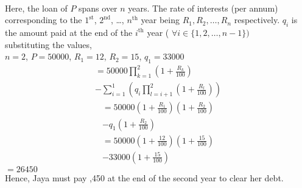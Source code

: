 \documentclass[journal,12pt,two column]{IEEEtran}
\begin{document}
\begin{enumerate}
\begin{multline}
\end{multline}
%
Here,
 the loan of \rupee$P$ spans over $n$ years. The rate of interests (per annum) corresponding to the $1^\text{st}$, $2^\text{nd}$, \ldots, $n^\text{th}$ year being $R_1, R_2, \ldots, R_n$  respectively. \rupee$q_i$ is the amount paid at the end of the  $i^\text{th}$ year ( $\forall i\in \{1,2,\ldots,n-1\})$\\
substituting the values,\\
$n = 2$, $P = 50000$, $R_1=12$, $R_2=15$, ${q_1=33000}$
 \begin{multline*}
     = 50000 \prod_{k = 1}^{2}  {\left(  1+\frac{R_k}{100}     \right)} \\ - \sum_{i=1}^{1}{\left(q_i\prod_{l=i+1}^{2}{\left(1+\frac{R_l}{100}\right)}\right)}
\end{multline*}
\begin{multline*}
     =50000\left(1+\frac{R_1}{100}\right)\left(1+\frac{R_2}{100}\right)\\ - q_1\left(1+\frac{R_2}{100}\right)
\end{multline*}
\begin{multline*}
         =50000\left(1+\frac{12}{100}\right)\left(1+\frac{15}{100}\right) \\ - 33000\left(1+\frac{15}{100}\right)
\end{multline*}
\hspace{5mm}$= 26450$\\
Hence, Jaya must pay ,450 at the end of the second year to clear her debt.
\end{enumerate}
\end{document}

